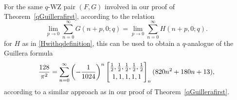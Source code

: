 \documentclass[12pt]{article}
\begin{document}
 For the same $q$-WZ pair $(F, G)$ involved in our proof of Theorem~\ref{qGuillerafirst}, 
 according to the relation 
\begin{equation*}
 \lim_{p \to 0} \sum_{n=0}^{\infty} G(n+p, 0; q) = \lim_{p \to 0} \sum_{n=0}^{\infty} 
 H(n+p,0; q). 
\end{equation*}
 for $H$ as in \eqref{Hwithqdefinition}, 
 this can be used to obtain a $q$-analogue of 
 the Guillera formula 
\begin{equation*}
 \frac{128}{\pi ^2} = \sum_{n = 0}^{\infty} 
 \left( -\frac{1}{1024} \right)^{n} 
 \left[ \begin{matrix} 
 \frac{1}{2}, \frac{1}{2}, \frac{1}{2}, \frac{1}{2}, \frac{1}{2} \vspace{1mm} \\ 
 1, 1, 1, 1, 1 \end{matrix} \right]_{n} (820 n^2+180 n+13), 
\end{equation*}
 according to a similar approach as in our proof of Theorem~\ref{qGuillerafirst}. 
\end{document}
